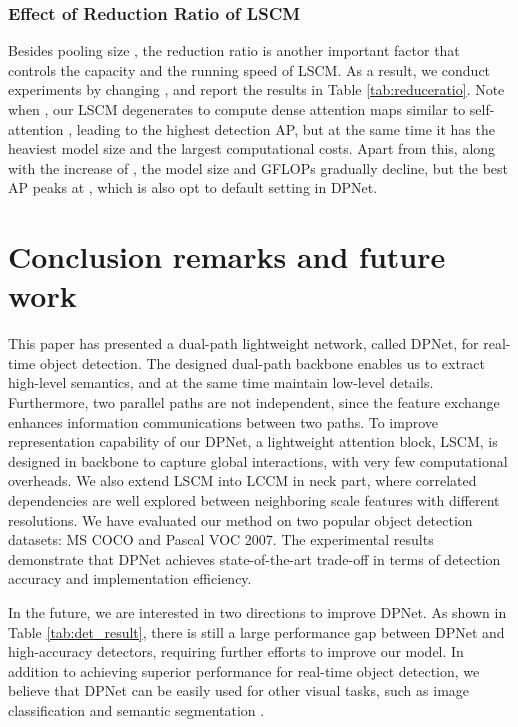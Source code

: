 \documentclass[lettersize,journal]{IEEEtran}
\begin{document}
\subsubsection{Effect of Reduction Ratio  of LSCM}
Besides pooling size , the reduction ratio  is another important factor that controls the capacity and the running speed of LSCM. As a result, we conduct experiments by changing , and report the results in Table \ref{tab:reduceratio}. Note when , our LSCM degenerates to compute dense attention maps similar to self-attention \cite{wang2018non}, leading to the highest detection AP, but at the same time it has the heaviest model size and the largest computational costs. Apart from this, along with the increase of , the model size and GFLOPs gradually decline, but the best AP peaks at , which is also opt to default setting in DPNet.



\section{Conclusion remarks and future work}\label{sec:Conclusion}

This paper has presented a dual-path lightweight network, called DPNet, for real-time object detection. The designed dual-path backbone enables us to extract high-level semantics, and at the same time maintain low-level details. Furthermore, two parallel paths are not independent, since the feature exchange enhances information communications between two paths. To improve representation capability of our DPNet, a lightweight attention block, LSCM, is designed in backbone to capture global interactions, with very few computational overheads. We also extend LSCM into LCCM in neck part, where correlated dependencies are well explored between neighboring scale features with different resolutions. We have evaluated our method on two popular object detection datasets: MS COCO and Pascal VOC 2007. The experimental results demonstrate that DPNet achieves state-of-the-art trade-off in terms of detection accuracy and implementation efficiency.

In the future, we are interested in two directions to improve DPNet. As shown in Table \ref{tab:det_result}, there is still a large performance gap between DPNet and high-accuracy detectors, requiring further efforts to improve our model. In addition to achieving superior performance for real-time object detection, we believe that DPNet can be easily used for other visual tasks, such as image classification \cite{resnet} and semantic segmentation \cite{huang2019ccnet,zhu2019asymmetric}.

  
\end{document}
